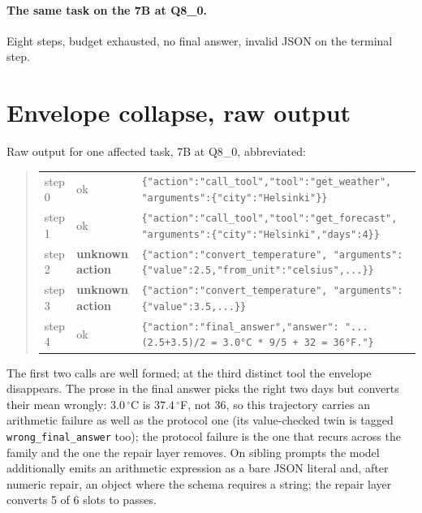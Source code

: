 \documentclass[11pt]{article}
\begin{document}
\paragraph{The same task on the 7B at Q8\_0.} Eight steps, budget exhausted, no final answer, invalid JSON on the terminal step.

\FloatBarrier
\section{Envelope collapse, raw output}
\label{app:envelope}
Raw output for one affected task, 7B at Q8\_0, abbreviated:

\begin{quote}\small
\begin{tabular}{llp{8.2cm}}
step 0 & ok & \verb|{"action":"call_tool","tool":"get_weather",|\linebreak\verb| "arguments":{"city":"Helsinki"}}| \\[2pt]
step 1 & ok & \verb|{"action":"call_tool","tool":"get_forecast",|\linebreak\verb| "arguments":{"city":"Helsinki","days":4}}| \\[2pt]
step 2 & \textbf{unknown action} & \verb|{"action":"convert_temperature",|\linebreak\verb| "arguments":{"value":2.5,"from_unit":"celsius",...}}| \\[2pt]
step 3 & \textbf{unknown action} & \verb|{"action":"convert_temperature",|\linebreak\verb| "arguments":{"value":3.5,...}}| \\[2pt]
step 4 & ok & \verb|{"action":"final_answer","answer":|\linebreak\verb| "... (2.5+3.5)/2 = 3.0°C * 9/5 + 32 = 36°F."}| \\
\end{tabular}
\end{quote}

The first two calls are well formed; at the third distinct tool the envelope disappears. The prose in the final answer picks the right two days but converts their mean wrongly: $3.0\,^{\circ}$C is $37.4\,^{\circ}$F, not 36, so this trajectory carries an arithmetic failure as well as the protocol one (its value-checked twin is tagged \texttt{wrong\_final\_answer} too); the protocol failure is the one that recurs across the family and the one the repair layer removes. On sibling prompts the model additionally emits an arithmetic expression as a bare JSON literal and, after numeric repair, an object where the schema requires a string; the repair layer converts 5 of 6 slots to passes.
\end{document}
